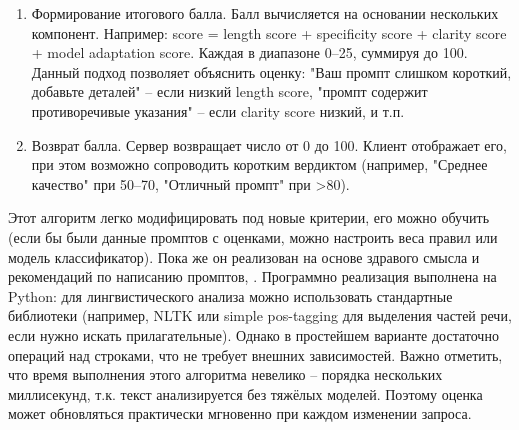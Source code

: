 \begin{enumerate}[label=\arabic*]
    \item Формирование итогового балла. Балл вычисляется на основании нескольких компонент. Например: score = length score + specificity score + clarity score + model adaptation score. Каждая в диапазоне 0–25, суммируя до 100. Данный подход позволяет объяснить оценку: "Ваш промпт слишком короткий, добавьте деталей" – если низкий length score, "промпт содержит противоречивые указания" – если clarity score низкий, и т.п.
    \item Возврат балла. Сервер возвращает число от 0 до 100. Клиент отображает его, при этом возможно сопроводить коротким вердиктом (например, "Среднее качество" при 50–70, "Отличный промпт" при >80).
\end{enumerate}
Этот алгоритм легко модифицировать под новые критерии, его можно обучить (если бы были данные промптов с оценками, можно настроить веса правил или модель классификатор). Пока же он реализован на основе здравого смысла и рекомендаций по написанию промптов\cite{vc:prompt}, \cite{promptingguide:basics}. Программно реализация выполнена на Python: для лингвистического анализа можно использовать стандартные библиотеки (например, NLTK или simple pos-tagging для выделения частей речи, если нужно искать прилагательные). Однако в простейшем варианте достаточно операций над строками, что не требует внешних зависимостей. Важно отметить, что время выполнения этого алгоритма невелико – порядка нескольких миллисекунд, т.к. текст анализируется без тяжёлых моделей. Поэтому оценка может обновляться практически мгновенно при каждом изменении запроса.

